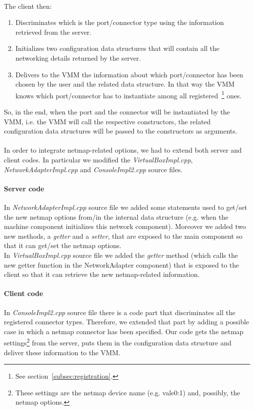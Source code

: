 \documentclass[a4paper, 12pt, titlepage]{report}
\begin{document}
\\
The client then: 
\begin{enumerate}
\item Discriminates which is the port/connector type using the information retrieved from the server.
\item Initializes two configuration data structures that will contain all the networking details returned by the server.
\item Delivers to the VMM the information about which port/connector has been chosen by the user and the related data structure. In that way the VMM knows which port/connector has to instantiate among all registered~\footnote{See section~\ref{subsec:registration}.} ones.
\end{enumerate} 
So, in the end, when the port and the connector will be instantiated by the VMM, i.e. the VMM will call the respective constructors, the related configuration data structures will be passed to the constructors as arguments.
\\
\\
In order to integrate netmap-related options, we had to extend both server and client codes. In particular we modified the \textit{VirtualBoxImpl.cpp}, \textit{NetworkAdapterImpl.cpp} and \textit{ConsoleImpl2.cpp} source files.

\paragraph{Server code} 
In \textit{NetworkAdapterImpl.cpp} source file we added some statements used to get/set the new netmap options from/in the internal data structure (e.g. when the machine component initializes this network component). Moreover we added two new methods, a \textit{getter} and a \textit{setter}, that are exposed to the main component so that it can get/set the netmap options.
\\
In \textit{VirtualBoxImpl.cpp} source file we added the \textit{getter} method (which calls the new getter function in the NetworkAdapter component) that is exposed to the client so that it can retrieve the new netmap-related information.

\paragraph{Client code} 
In \textit{ConsoleImpl2.cpp} source file there is a code part that discriminates all the registered connector types. Therefore, we extended that part by adding a possible case in which a netmap connector has been specified. Our code gets the netmap settings\footnote{These settings are the netmap device name (e.g. vale0:1) and, possibly, the netmap options.} from the server, puts them in the configuration data structure and deliver these information to the VMM.
\end{document}
